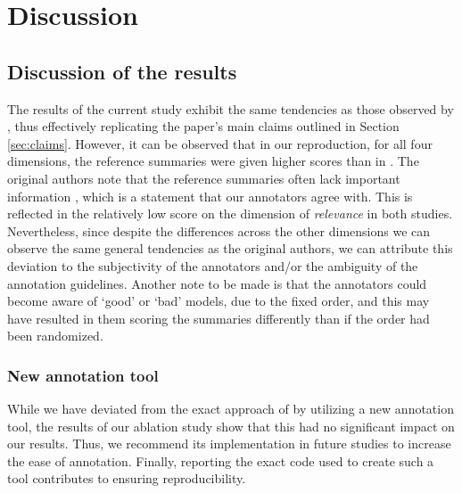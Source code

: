 \section{Discussion} \label{discussion}



\subsection{Discussion of the results}


The results of the current study exhibit the same tendencies as those observed by \citet{gao2022dialsummeval}, thus effectively replicating the paper's main claims outlined in Section \ref{sec:claims}. However, it can be observed that in our reproduction, for all four dimensions, the reference summaries were given higher scores than in \citet{gao2022dialsummeval}. The original authors note that the reference summaries often lack important information \cite{gao2022dialsummeval}, which is a statement that our annotators agree with. This is reflected in the relatively low score on the dimension of \textit{relevance} in both studies. Nevertheless, since despite the differences across the other dimensions we can observe the same general tendencies as the original authors, we can attribute this deviation to the subjectivity of the annotators and/or the ambiguity of the annotation guidelines. Another note to be made is that the annotators could become aware of `good' or `bad' models, due to the fixed order, and this may have resulted in them scoring the summaries differently than if the order had been randomized.





\subsubsection{New annotation tool}
While we have deviated from the exact approach of \citet{gao2022dialsummeval} by utilizing a new annotation tool, the results of our ablation study show that this had no significant impact on our results. Thus, we recommend its implementation in future studies to increase the ease of annotation. Finally, reporting the exact code used to create such a tool contributes to ensuring reproducibility.


